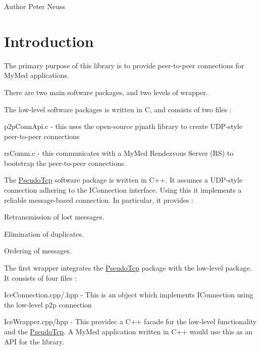\begin{DoxyAuthor}{Author}
Peter Neuss
\end{DoxyAuthor}
\hypertarget{index_intro}{}\section{Introduction}\label{index_intro}
The primary purpose of this library is to provide peer-\/to-\/peer connections for MyMed applications.

There are two main software packages, and two levels of wrapper.

The low-\/level software packages is written in C, and consists of two files :
\begin{DoxyItemize}
\item p2pConnApi.c -\/ this uses the open-\/source pjnath library to create UDP-\/style peer-\/to-\/peer connections
\item rsComm.c -\/ this communicates with a MyMed Rendezvous Server (RS) to bootstrap the peer-\/to-\/peer connections.
\end{DoxyItemize}

The \hyperlink{namespacePseudoTcp}{PseudoTcp} software package is written in C++. It assumes a UDP-\/style connection adhering to the IConnection interface. Using this it implements a reliable message-\/based connection. In particular, it provides :
\begin{DoxyEnumerate}
\item Retransmission of lost messages.
\item Elimination of duplicates.
\item Ordering of messages.
\end{DoxyEnumerate}

The first wrapper integrates the \hyperlink{namespacePseudoTcp}{PseudoTcp} package with the low-\/level package. It consists of four files :
\begin{DoxyItemize}
\item IceConnection.cpp/.hpp -\/ This is an object which implements IConnection using the low-\/level p2p connection
\item IceWrapper.cpp/hpp -\/ This providec a C++ facade for the low-\/level functionality and the \hyperlink{namespacePseudoTcp}{PseudoTcp}. A MyMed application written in C++ would use this as an API for the library.
\end{DoxyItemize}

